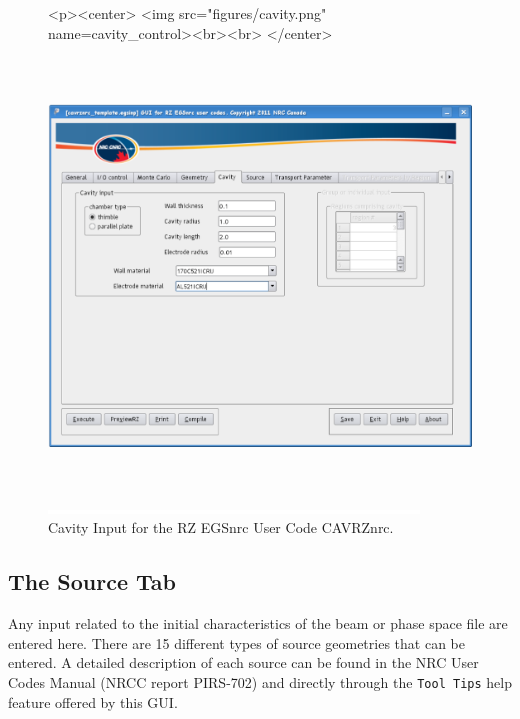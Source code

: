 \documentclass[12pt,twoside]{article}   %
\begin{document}
\begin{figure}[htb]
\begin{htmlonly}
\begin{rawhtml}
<p><center>
<img src="figures/cavity.png" name=cavity_control><br><br>
</center>
\end{rawhtml}
\end{htmlonly}
\begin{latexonly}
\begin{center}
\includegraphics[height=11.56cm]{figures/cavity}
\end{center}
\end{latexonly}
\begin{center}
\includegraphics[height=1mm]{figures/fake2}
\end{center}
\caption{Cavity Input for the RZ EGSnrc User Code CAVRZnrc.}
\label{cavity_control}
\end{figure}

\clearpage
\newpage
\subsection{The Source Tab}
Any input related to the initial characteristics of the beam or phase space file are entered
here. There are 15 different types of source geometries that can be entered. A detailed description
of each source can be found in the NRC User Codes Manual (NRCC report PIRS-702\cite{Ro10}) 
and directly through the {\tt Tool Tips} help feature offered by this GUI. \\ \\ 
\end{document}
